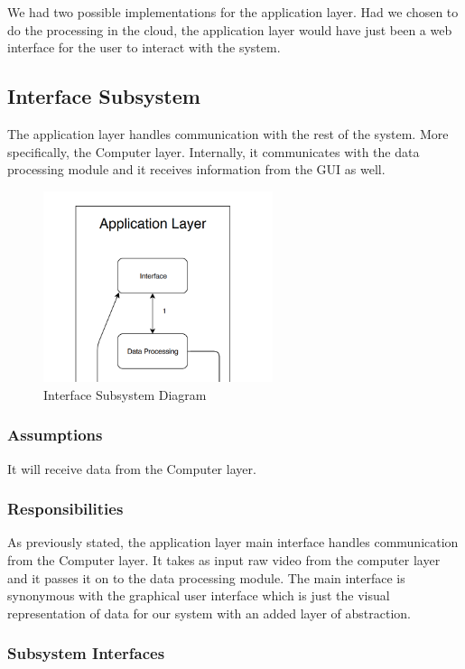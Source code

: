 We had two possible implementations for the application layer. Had we chosen to do the processing in the cloud, the application layer would have just been a web interface for the user to interact with the system.

\subsection{Interface Subsystem}
The application layer handles communication with the rest of the system. More specifically, the Computer layer. Internally, it communicates with the data processing module and it receives information from the GUI as well.

\begin{figure}[h!]
	\centering
 	\includegraphics[width=0.60\textwidth]{images/app_sub_1}
 \caption{Interface Subsystem Diagram}
\end{figure}

\subsubsection{Assumptions}
It will receive data from the Computer layer.

\subsubsection{Responsibilities}
As previously stated, the application layer main interface handles communication from the Computer layer. It takes as input raw video from the computer layer and it passes it on to the data processing module. The main interface is synonymous with the graphical user interface which is just the visual representation of data for our system with an added layer of abstraction.

\subsubsection{Subsystem Interfaces}

